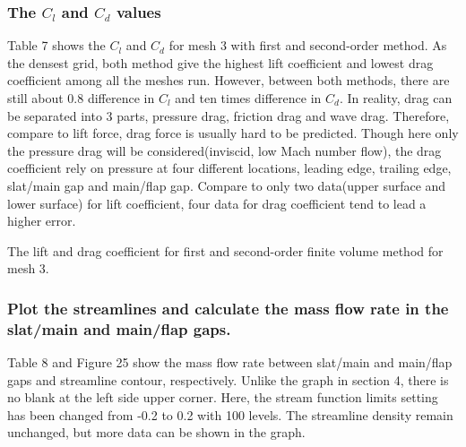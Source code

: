 \documentclass[letterpaper,onecolumn,12pt]{article}
\makeatletter
\newenvironment{tablehere}
  {\def\@captype{table}}{}
\makeatother
\begin{document}
\subsubsection{The $C_l$ and $C_d$ values}
Table 7 shows the $C_l$ and $C_d$ for mesh 3 with first and second-order method. As the densest grid, both method give the highest lift coefficient and lowest drag coefficient among all the meshes run. However, between both methods, there are still about 0.8 difference in $C_l$ and ten times difference in $C_d$. In reality, drag can be separated into 3 parts, pressure drag, friction drag and wave drag. Therefore, compare to lift force, drag force is usually hard to be predicted. Though here only the pressure drag will be considered(inviscid, low Mach number flow), the drag coefficient rely on pressure at four different locations, leading edge, trailing edge, slat/main gap and main/flap gap. Compare to only two data(upper surface and lower surface) for lift coefficient, four data for drag coefficient tend to lead a higher error.

\bigskip

\begin{tablehere}
\centering
{}
\qquad
{}
\caption{The lift and drag coefficient for first and second-order finite volume method for mesh 3.}
\end{tablehere} 

\subsubsection{Plot the streamlines and calculate the mass flow rate in the slat/main and main/flap gaps.}
Table 8 and Figure 25 show the mass flow rate between slat/main and main/flap gaps and streamline contour, respectively. Unlike the graph in section 4, there is no blank at the left side upper corner. Here, the stream function limits setting has been changed from -0.2 to 0.2 with 100 levels. The streamline density remain unchanged, but more data can be shown in the graph. 
\end{document}
